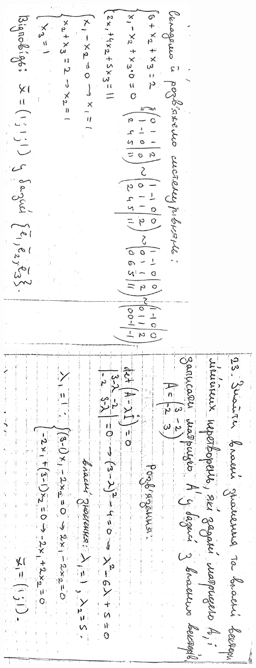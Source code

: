 \documentclass{article}
\begin{document}
\includegraphics[width=10cm,angle=90]{ons/16.jpg}\\
\includegraphics[width=14cm,angle=90]{ons/17.jpg}\\
\end{document}
